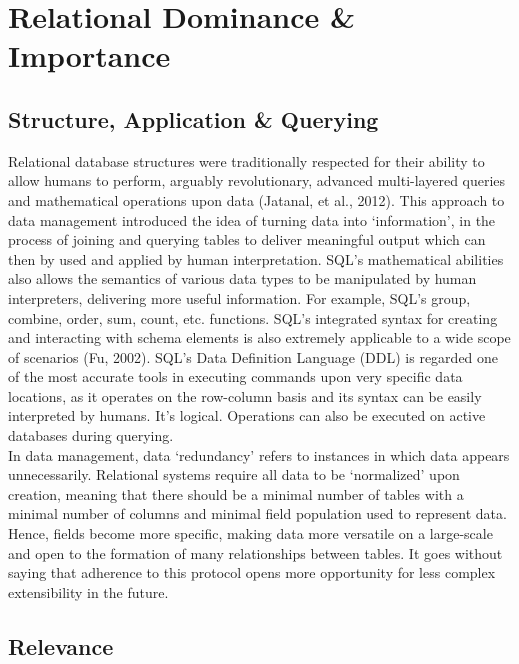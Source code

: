 \documentclass[11pt, english]{article}
\begin{document}
\section{Relational Dominance \& Importance}

	\subsection{Structure, Application \& Querying}

	Relational database structures were traditionally respected for their ability to allow humans to perform, arguably revolutionary, advanced multi-layered queries and mathematical operations upon data (Jatanal, et al., 2012). This approach to data management introduced the idea of turning data into `information', in the process of joining and querying tables to deliver meaningful output which can then by used and applied by human interpretation. SQL's mathematical abilities also allows the semantics of various data types to be manipulated by human interpreters, delivering more useful information. For example, SQL's group, combine, order, sum, count, etc. functions. SQL's integrated syntax for creating and interacting with schema elements is also extremely applicable to a wide scope of scenarios (Fu, 2002). SQL's Data Definition Language (DDL) is regarded one of the most accurate tools in executing commands upon very specific data locations, as it operates on the row-column basis and its syntax can be easily interpreted by humans. It's logical. Operations can also be executed on active databases during querying.\\

	In data management, data `redundancy' refers to instances in which data appears unnecessarily. Relational systems require all data to be `normalized' upon creation, meaning that there should be a minimal number of tables with a minimal number of columns and minimal field population used to represent data. Hence, fields become more specific, making data more versatile on a large-scale and open to the formation of many relationships between tables. It goes without saying that adherence to this protocol opens more opportunity for less complex extensibility in the future.

	\subsection{Relevance}
\end{document}
